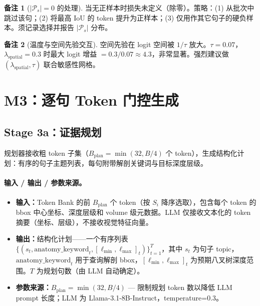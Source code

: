 \documentclass[11pt,a4paper]{article}
\theoremstyle{definition}
\newtheorem{remark}{备注}[section]
\begin{document}
\begin{remark}[$|\mathcal{P}_s|=0$ 的处理]
当无正样本时损失未定义（除零）。策略：(1) 从批次中跳过该句；(2) 将最高 IoU 的 token 提升为正样本；(3) 仅用作其它句子的硬负样本。须记录选择并报告 $|\mathcal{P}_s|$ 分布。
\end{remark}

\begin{remark}[温度与空间先验交互]
空间先验在 logit 空间被 $1/\tau$ 放大。$\tau=0.07$，$\lambda_{\mathrm{spatial}}=0.3$ 时最大 logit 增益 $= 0.3/0.07 \approx 4.3$，非常显著。强烈建议做 $(\lambda_{\mathrm{spatial}}, \tau)$ 联合敏感性网格。
\end{remark}


\section{M3：逐句 Token 门控生成}

\subsection{Stage 3a：证据规划}

规划器接收粗 token 子集（$B_{\mathrm{plan}} = \min(32, B/4)$ 个 token），生成结构化计划：有序的句子主题列表，每句附带解剖关键词与目标深度层级。

\paragraph{输入 / 输出 / 参数来源。}
\begin{itemize}[nosep]
    \item \textbf{输入：}Token Bank 的前 $B_{\mathrm{plan}}$ 个 token（按 $S_i$ 降序选取），包含每个 token 的 bbox 中心坐标、深度层级和 volume 级元数据。LLM 仅接收文本化的 token 摘要（坐标、层级），不接收视觉特征向量。
    \item \textbf{输出：}结构化计划——一个有序列表 $\{(s_t, \mathrm{anatomy\_keyword}_t, [\ell_{\min}, \ell_{\max}]_t)\}_{t=1}^{T}$，其中 $s_t$ 为句子 topic，$\mathrm{anatomy\_keyword}_t$ 用于查询解剖 bbox，$[\ell_{\min}, \ell_{\max}]_t$ 为预期八叉树深度范围。$T$ 为规划句数（由 LLM 自动确定）。
    \item \textbf{参数来源：}$B_{\mathrm{plan}} = \min(32, B/4)$ — 限制规划 token 数以降低 LLM prompt 长度；LLM 为 Llama-3.1-8B-Instruct，temperature=0.3。
\end{itemize}
\end{document}
